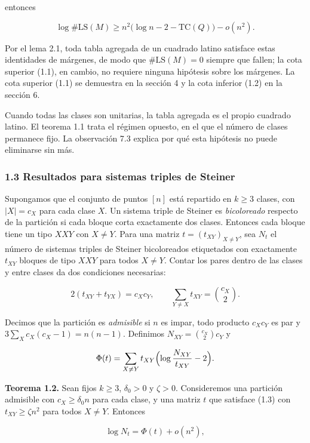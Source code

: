 \documentclass[spanish,11pt,a4paper]{article}
\begin{document}
entonces

\nopagebreak[4]
\[\log\#\mathrm{LS}(M)\ge n^2\bigl(\log n-2-\mathrm{TC}(Q)\bigr)-o(n^2).\tag{1.2}\]

Por el lema 2.1, toda tabla agregada de un cuadrado latino satisface estas identidades de márgenes, de modo que \(\#\mathrm{LS}(M)=0\) siempre que fallen; la cota superior (1.1), en cambio, no requiere ninguna hipótesis sobre los márgenes. La cota superior (1.1) se demuestra en la sección 4 y la cota inferior (1.2) en la sección 6.

Cuando todas las clases son unitarias, la tabla agregada es el propio cuadrado latino. El teorema 1.1 trata el régimen opuesto, en el que el número de clases permanece fijo. La observación 7.3 explica por qué esta hipótesis no puede eliminarse sin más.

\subsubsection{1.3 Resultados para sistemas triples de Steiner}\label{resultados-para-sistemas-triples-de-steiner}

Supongamos que el conjunto de puntos \([n]\) está repartido en \(k\ge3\) clases, con \(|X|=c_X\) para cada clase \(X\). Un sistema triple de Steiner es \emph{bicoloreado} respecto de la partición si cada bloque corta exactamente dos clases. Entonces cada bloque tiene un tipo \(XXY\) con \(X\ne Y\). Para una matriz \(t=(t_{XY})_{X\ne Y}\), sea \(N_t\) el número de sistemas triples de Steiner bicoloreados etiquetados con exactamente \(t_{XY}\) bloques de tipo \(XXY\) para todos \(X\ne Y\). Contar los pares dentro de las clases y entre clases da dos condiciones necesarias:

\nopagebreak[4]
\[2(t_{XY}+t_{YX})=c_Xc_Y,\qquad \sum_{Y\ne X}t_{XY}=\binom{c_X}{2}.\tag{1.3}\]

Decimos que la partición es \emph{admisible} si \(n\) es impar, todo producto \(c_Xc_Y\) es par y \(3\sum_X c_X(c_X-1)=n(n-1)\). Definimos \(N_{XY}=\binom{c_X}{2}c_Y\) y

\nopagebreak[4]
\[\Phi(t)=\sum_{X\ne Y}t_{XY}\Bigl(\log\frac{N_{XY}}{t_{XY}}-2\Bigr).\]

\textbf{Teorema 1.2.} Sean fijos \(k\ge3\), \(\delta_0>0\) y \(\zeta>0\). Consideremos una partición admisible con \(c_X\ge\delta_0 n\) para cada clase, y una matriz \(t\) que satisface (1.3) con \(t_{XY}\ge\zeta n^2\) para todos \(X\ne Y\). Entonces

\nopagebreak[4]
\[\log N_t=\Phi(t)+o(n^2),\]
\end{document}
